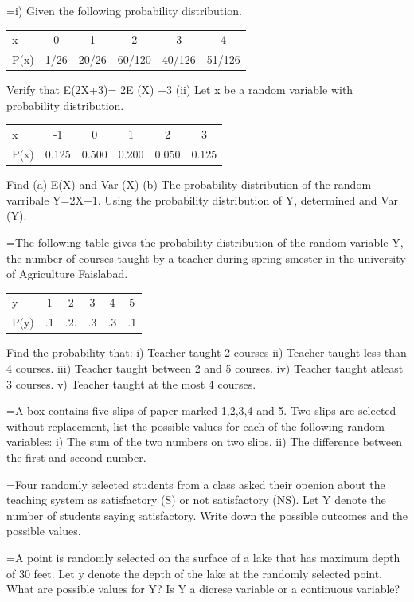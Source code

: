 \documentclass[11pt,a4paper]{article}
\newlength{\qw}
\newcommand{\q}[2]{%
  \Needspace{3\baselineskip}%
  \par\medskip\noindent\hangindent=\qw\hangafter=1\makebox[\qw][l]{\textbf{#1.}}#2\par}
\begin{document}
\q{155}{i) Given the following probability distribution.\par\smallskip
\begin{tabular}{|l|ccccc|}\hline
x & 0 & 1 & 2 & 3 & 4\\
P(x) & 1/26 & 20/26 & 60/120 & 40/126 & 51/126\\\hline
\end{tabular}\par\smallskip
Verify that E(2X+3)= 2E (X) +3 (ii) Let x be a random variable with probability distribution.\par\smallskip
\begin{tabular}{|l|ccccc|}\hline
x & -1 & 0 & 1 & 2 & 3\\
P(x) & 0.125 & 0.500 & 0.200 & 0.050 & 0.125\\\hline
\end{tabular}\par\smallskip
Find (a) E(X) and Var (X)  (b) The probability distribution of the random varribale Y=2X+1. Using the probability distribution of Y, determined and Var (Y).}
\q{156}{The following table gives the probability distribution of the random variable Y, the number of courses taught by a teacher during spring smester in the university of Agriculture Faislabad.\par\smallskip
\begin{tabular}{|l|ccccc|}\hline
y & 1 & 2 & 3 & 4 & 5\\
P(y) & .1 & .2. & .3 & .3 & .1\\\hline
\end{tabular}\par\smallskip
Find the probability that: i) Teacher taught 2 courses ii) Teacher taught less than 4 courses. iii) Teacher taught between 2 and 5 courses. iv) Teacher taught atleast 3 courses. v) Teacher taught at the most 4 courses.}
\q{157}{A box contains five slips of paper marked 1,2,3,4 and 5. Two slips are selected without replacement, list the possible values for each of the following random variables: i) The sum of the two numbers on two slips. ii) The difference between the first and second number.}
\q{158}{Four randomly selected students from a class asked their openion about the teaching system as satisfactory (S) or not satisfactory (NS). Let Y denote the number of students saying satisfactory. Write down the possible outcomes and the possible values.}
\q{159}{A point is randomly selected on the surface of a lake that has maximum depth of 30 feet. Let y denote the depth of the lake at the randomly selected point. What are possible values for Y? Is Y a dicrese variable or a continuous variable?}
\end{document}
